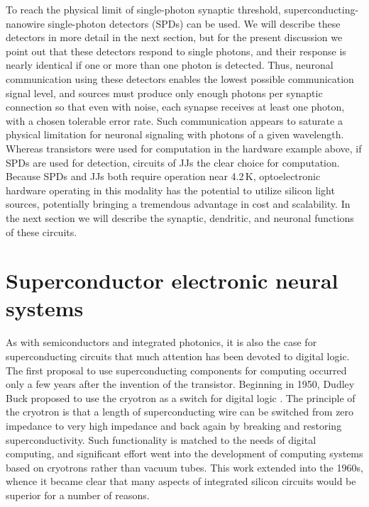 \documentclass[twocolumn]{article}
\begin{document}
To reach the physical limit of single-photon synaptic threshold, superconducting-nanowire single-photon detectors (SPDs) can be used. We will describe these detectors in more detail in the next section, but for the present discussion we point out that these detectors respond to single photons, and their response is nearly identical \cite{} if one or more than one photon is detected. Thus, neuronal communication using these detectors enables the lowest possible communication signal level, and sources must produce only enough photons per synaptic connection so that even with noise, each synapse receives at least one photon, with a chosen tolerable error rate. Such communication appears to saturate a physical limitation for neuronal signaling with photons of a given wavelength. Whereas transistors were used for computation in the hardware example above, if SPDs are used for detection, circuits of JJs the clear choice for computation. Because SPDs and JJs both require operation near 4.2\,K, optoelectronic hardware operating in this modality has the potential to utilize silicon light sources, potentially bringing a tremendous advantage in cost and scalability. In the next section we will describe the synaptic, dendritic, and neuronal functions of these circuits. 

\vspace{3em}
\cite{cosc2018} 

\cite{rofi2017}

\section{\label{sec:superconductors}Superconductor electronic neural systems}
As with semiconductors and integrated photonics, it is also the case for superconducting circuits that much attention has been devoted to digital logic. The first proposal to use superconducting components for computing occurred only a few years after the invention of the transistor. Beginning in 1950, Dudley Buck proposed to use the cryotron as a switch for digital logic \cite{bu1956,bu1950}. The principle of the cryotron is that a length of superconducting wire can be switched from zero impedance to very high impedance and back again by breaking and restoring superconductivity. Such functionality is matched to the needs of digital computing, and significant effort went into the development of computing systems based on cryotrons rather than vacuum tubes. This work extended into the 1960s, whence it became clear that many aspects of integrated silicon circuits would be superior for a number of reasons. 
\end{document}
